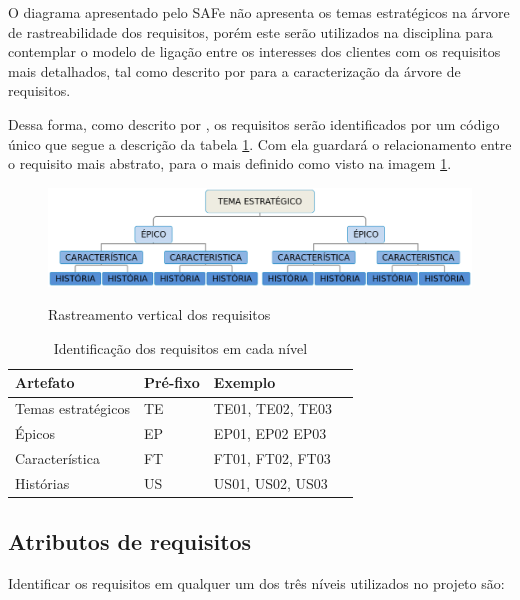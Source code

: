 O diagrama apresentado pelo SAFe não apresenta os temas estratégicos na árvore de rastreabilidade dos requisitos, porém este serão utilizados na disciplina para contemplar o modelo de ligação entre os interesses dos clientes com os requisitos mais detalhados, tal como descrito por \cite{leffingwell2011} para a caracterização da árvore de requisitos.

Dessa forma, como descrito por \cite{silva2011}, os requisitos serão identificados por um código único que segue a descrição da tabela \ref{identificadores}. Com ela guardará o relacionamento entre o requisito mais abstrato, para o mais definido como visto na imagem \ref{rastreabilidade}.
\begin{figure}[H]
    \centering
    \caption{Rastreamento vertical dos requisitos}
    \includegraphics[keepaspectratio=true,scale=0.4]{figuras/rastreabilidade.eps}
    \label{rastreabilidade}
\end{figure}
\begin{table}[h]
    \centering
    \caption{Identificação dos requisitos em cada nível}
    \label{identificadores}
    \begin{tabular}{l|l|l|l}
        Artefato & Pré-fixo & Exemplo \\
        \hline    
        Temas estratégicos & TE & TE01, TE02, TE03 \\
        Épicos & EP & EP01, EP02 EP03 \\
        Característica & FT & FT01, FT02, FT03 \\
        Histórias & US & US01, US02, US03 \\
    \end{tabular}
\end{table}

\subsection{Atributos de requisitos}

Identificar os requisitos em qualquer um dos três níveis utilizados no projeto são:

